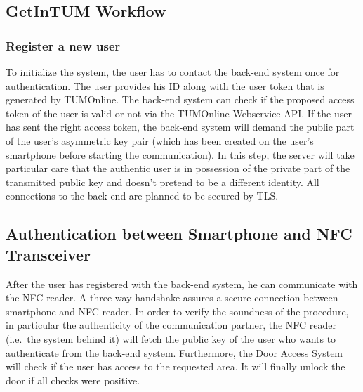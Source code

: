 \bigskip




\subsection{GetInTUM Workflow}\label{sec:workflow}

\subsubsection*{Register a new user}

To initialize the system, the user has to contact the back-end system once for authentication.
The user provides his ID along with the user token that is generated by TUMOnline.
The back-end system can check if the proposed access token of the user is valid or not via the TUMOnline Webservice API.
If the user has sent the right access token, the back-end system will demand the public part of the user's asymmetric key pair (which has been created on the user's smartphone before starting the communication).
In this step, the server will take particular care that the authentic user is in possession of the private part of the transmitted public key and doesn't pretend to be a different identity.
All connections to the back-end are planned to be secured by TLS.


\subsection{Authentication between Smartphone and NFC Transceiver}
After the user has registered with the back-end system, he can communicate with the NFC reader. 
A three-way handshake assures a secure connection between smartphone and NFC reader.
In order to verify the soundness of the procedure, in particular the authenticity of the communication partner, the NFC reader (i.e.~the system behind it) will fetch the public key of the user who wants to authenticate from the back-end system.
Furthermore, the Door Access System will check if the user has access to the requested area.
It will finally unlock the door if all checks were positive.
